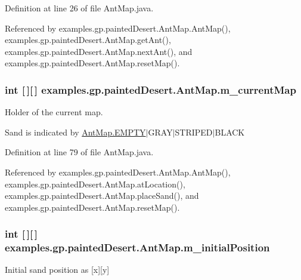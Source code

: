 Definition at line 26 of file Ant\-Map.\-java.



Referenced by examples.\-gp.\-painted\-Desert.\-Ant\-Map.\-Ant\-Map(), examples.\-gp.\-painted\-Desert.\-Ant\-Map.\-get\-Ant(), examples.\-gp.\-painted\-Desert.\-Ant\-Map.\-next\-Ant(), and examples.\-gp.\-painted\-Desert.\-Ant\-Map.\-reset\-Map().

\hypertarget{classexamples_1_1gp_1_1painted_desert_1_1_ant_map_a3d0989db01dd310b39ff9f9749818465}{
\subsubsection[{m\-\_\-current\-Map}]{\setlength{\rightskip}{0pt plus 5cm}int \mbox{[}$\,$\mbox{]}\mbox{[}$\,$\mbox{]} examples.\-gp.\-painted\-Desert.\-Ant\-Map.\-m\-\_\-current\-Map\hspace{0.3cm}{\ttfamily [private]}}}\label{classexamples_1_1gp_1_1painted_desert_1_1_ant_map_a3d0989db01dd310b39ff9f9749818465}
Holder of the current map.

Sand is indicated by \hyperlink{classexamples_1_1gp_1_1painted_desert_1_1_ant_map_a615af6a550b5cc40655f383d6f7ee97e}{Ant\-Map.\-E\-M\-P\-T\-Y}$|$\-G\-R\-A\-Y$|$\-S\-T\-R\-I\-P\-E\-D$|$\-B\-L\-A\-C\-K 

Definition at line 79 of file Ant\-Map.\-java.



Referenced by examples.\-gp.\-painted\-Desert.\-Ant\-Map.\-Ant\-Map(), examples.\-gp.\-painted\-Desert.\-Ant\-Map.\-at\-Location(), examples.\-gp.\-painted\-Desert.\-Ant\-Map.\-place\-Sand(), and examples.\-gp.\-painted\-Desert.\-Ant\-Map.\-reset\-Map().

\hypertarget{classexamples_1_1gp_1_1painted_desert_1_1_ant_map_a289ec5e8a730110d962f03c360ea3041}{
\subsubsection[{m\-\_\-initial\-Position}]{\setlength{\rightskip}{0pt plus 5cm}int \mbox{[}$\,$\mbox{]}\mbox{[}$\,$\mbox{]} examples.\-gp.\-painted\-Desert.\-Ant\-Map.\-m\-\_\-initial\-Position\hspace{0.3cm}{\ttfamily [private]}}}\label{classexamples_1_1gp_1_1painted_desert_1_1_ant_map_a289ec5e8a730110d962f03c360ea3041}
Initial sand position as \mbox{[}x\mbox{]}\mbox{[}y\mbox{]} 

